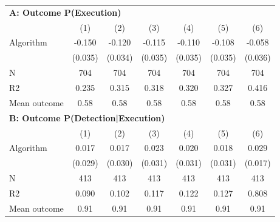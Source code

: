 \begin{tabular}{lcccccc} \toprule
\multicolumn{7}{l}{\textbf{A: Outcome P(Execution)}} \\ \multicolumn{1}{l}{} & (1) & (2) & (3) & (4) & (5) & (6) \\ \midrule
Algorithm   &      -0.150\sym{***}&      -0.120\sym{***}&      -0.115\sym{***}&      -0.110\sym{***}&      -0.108\sym{***}&      -0.058         \\
            &     (0.035)         &     (0.034)         &     (0.035)         &     (0.035)         &     (0.035)         &     (0.036)         \\
\midrule
N           &         704         &         704         &         704         &         704         &         704         &         704         \\
R2          &       0.235         &       0.315         &       0.318         &       0.320         &       0.327         &       0.416         \\
Mean outcome&        0.58         &        0.58         &        0.58         &        0.58         &        0.58         &        0.58         \\

\midrule \multicolumn{7}{l}{\textbf{B: Outcome P(Detection|Execution)}} \\ \multicolumn{1}{l}{} & (1) & (2) & (3) & (4) & (5) & (6) \\ \midrule
Algorithm   &       0.017         &       0.017         &       0.023         &       0.020         &       0.018         &       0.029\sym{*}  \\
            &     (0.029)         &     (0.030)         &     (0.031)         &     (0.031)         &     (0.031)         &     (0.017)         \\
\midrule
N           &         413         &         413         &         413         &         413         &         413         &         413         \\
R2          &       0.090         &       0.102         &       0.117         &       0.122         &       0.127         &       0.808         \\
Mean outcome&        0.91         &        0.91         &        0.91         &        0.91         &        0.91         &        0.91         \\


\end{tabular}
